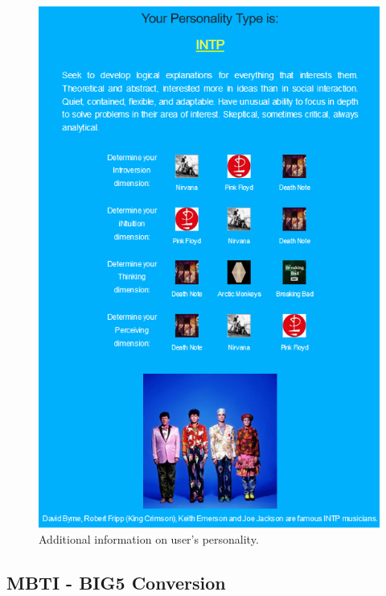 \documentclass[b5paper,10pt,twoside,cucitura]{toptesi}
\begin{document}
\begin{figure}[ht]
\centering
\includegraphics[scale=0.59]{website2.png}
\caption{Additional information on user's personality.}
\end{figure}


\pagebreak

\subsection{MBTI - BIG5 Conversion}
\end{document}
